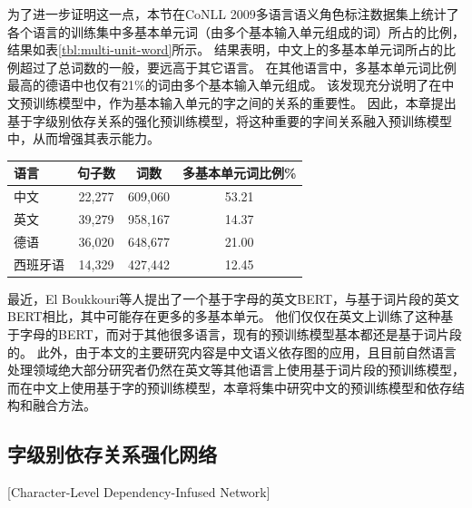 为了进一步证明这一点，本节在CoNLL 2009\cite{hajic-etal-2009-conll}多语言语义角色标注数据集上统计了各个语言的训练集中多基本单元词（由多个基本输入单元组成的词）所占的比例，结果如表\ref{tbl:multi-unit-word}所示。
结果表明，中文上的多基本单元词所占的比例超过了总词数的一般，要远高于其它语言。
在其他语言中，多基本单元词比例最高的德语中也仅有21\%的词由多个基本输入单元组成。
该发现充分说明了在中文预训练模型中，作为基本输入单元的字之间的关系的重要性。
因此，本章提出基于字级别依存关系的强化预训练模型，将这种重要的字间关系融入预训练模型中，从而增强其表示能力。

\begin{table}[htpb]
    \vspace{0.5em}\centering\wuhao
    \begin{tabular}{lccc}
        \toprule[1.5pt]
        语言 & 句子数 & 词数 & 多基本单元词比例\%  \\
        \midrule[1pt]
        中文  & 22,277  & 609,060  & 53.21 \\
        英文  & 39,279  & 958,167  & 14.37 \\
        德语   & 36,020  & 648,677  & 21.00 \\
        西班牙语 & 14,329  & 427,442  & 12.45 \\
        \bottomrule[1.5pt]
    \end{tabular}
\end{table}

最近，El Boukkouri等人\cite{el-boukkouri-etal-2020-characterbert}提出了一个基于字母的英文BERT，与基于词片段的英文BERT相比，其中可能存在更多的多基本单元。
他们仅仅在英文上训练了这种基于字母的BERT，而对于其他很多语言，现有的预训练模型基本都还是基于词片段的。
此外，由于本文的主要研究内容是中文语义依存图的应用，且目前自然语言处理领域绝大部分研究者仍然在英文等其他语言上使用基于词片段的预训练模型，而在中文上使用基于字的预训练模型，本章将集中研究中文的预训练模型和依存结构和融合方法。

\subsection{字级别依存关系强化网络}[Character-Level Dependency-Infused Network]
\label{sec:chapter5-char-level-dep-infusion}

